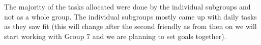 The majority of the tasks allocated were done by the individual subgroups and not as a whole group. The individual subgroups mostly came up with daily tasks as they saw fit (this will change after the second friendly as from then on we will start working with Group 7 and we are planning to set goals together). 